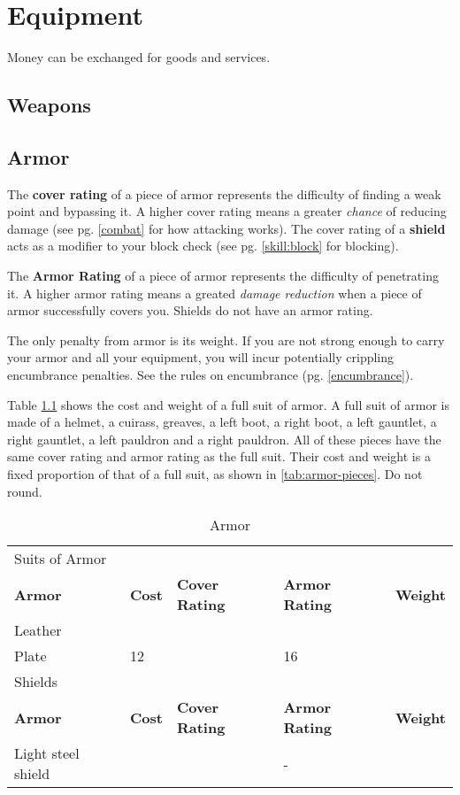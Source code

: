 \chapter{Equipment}\label{equipment}

Money can be exchanged for goods and services.

\section{Weapons}

\begin{multicols}{2}
\section{Armor}
The \textbf{cover rating} of a piece of armor represents the difficulty of
finding a weak point and bypassing it. A higher cover rating means a greater \textit{chance}
of reducing damage (see pg. \ref{combat} for how attacking works). The cover
rating of a \textbf{shield} acts as a modifier to your block check (see pg.
\ref{skill:block} for blocking).

The \textbf{Armor Rating} of a piece of armor represents the difficulty of
penetrating it. A higher armor rating means a greated \textit{damage reduction}
when a piece of armor successfully covers you. Shields do not have an armor
rating.

The only penalty from armor is its weight. If you are not strong enough to
carry your armor and all your equipment, you will incur potentially
crippling encumbrance penalties. See the rules on encumbrance (pg.
\ref{encumbrance}).

Table \ref{tab:armor} shows the cost and weight of a full suit of armor. A full
suit of armor is made of a helmet, a cuirass, greaves, a left boot, a right
boot, a left gauntlet, a right gauntlet, a left pauldron and a right pauldron.
All of these pieces have the same cover rating and armor rating as the full
suit. Their cost and weight is a fixed proportion of that of a full suit, as
shown in \ref{tab:armor-pieces}. Do not round.
\end{multicols}

\begin{table}[h]
    \unclassedrowcolors
    \begin{tabular*}{\textwidth}{l l l l l}
        \multicolumn{5}{l}{Suits of Armor} \\
        \textbf{Armor} & \textbf{Cost} & \textbf{Cover Rating} & \textbf{Armor Rating} & \textbf{Weight} \\
        Leather & & & & \\
        Plate & 12 & & 16 & \\
        \multicolumn{5}{l}{Shields} \\
        \textbf{Armor} & \textbf{Cost} & \textbf{Cover Rating} & \textbf{Armor Rating} & \textbf{Weight} \\
        Light steel shield & & & - & \\
    \end{tabular*}
    \caption{Armor}
    \label{tab:armor}
\end{table}

